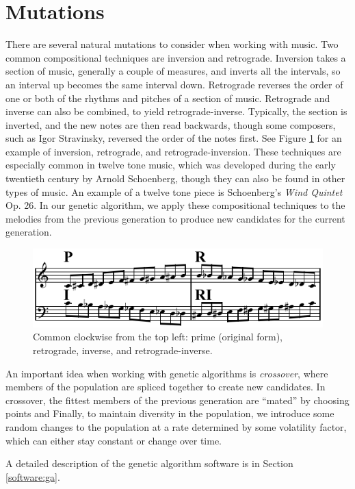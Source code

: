 \section{Mutations} \label{ga:mutate}

There are several natural mutations to consider when working with music.
Two common compositional techniques are inversion and retrograde.
Inversion takes a section of music, generally a couple of measures, and inverts all the intervals, so an interval up becomes the same interval down.
Retrograde reverses the order of one or both of the rhythms and pitches of a section of music.
Retrograde and inverse can also be combined, to yield retrograde-inverse.
Typically, the section is inverted, and the new notes are then read backwards, though some composers, such as Igor Stravinsky, reversed the order of the notes first.
See Figure \ref{fig:p-r-i-ri} for an example of inversion, retrograde, and retrograde-inversion.
These techniques are especially common in twelve tone music, which was developed during the early twentieth century by Arnold Schoenberg, though they can also be found in other types of music. %
An example of a twelve tone piece is Schoenberg's \textit{Wind Quintet} Op. 26.
In our genetic algorithm, we apply these compositional techniques to the melodies from the previous generation to produce new candidates for the current generation.

\begin{figure}
	\centering
	\includegraphics[width=\linewidth]{figures/P-R-I-RI.png} %
	\caption{Common  clockwise from the top left: prime (original form), retrograde, inverse, and retrograde-inverse.}
	\label{fig:p-r-i-ri}
\end{figure}

An important idea when working with genetic algorithms is \textit{crossover}, where members of the population are spliced together to create new candidates.
In crossover, the fittest members of the previous generation are ``mated'' by choosing points and 
Finally, to maintain diversity in the population, we introduce some random changes to the population at a rate determined by some volatility factor, which can either stay constant or change over time.



A detailed description of the genetic algorithm software is in Section \ref{software:ga}.